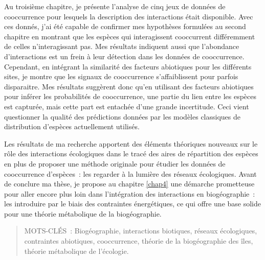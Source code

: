 Au troisième chapitre, je présente l'analyse de cinq jeux de données de
cooccurrence pour lesquels la description des interactions était
disponible. Avec ces donnés, j'ai été capable de confirmer mes
hypothèses formulées au second chapitre en montrant que les espèces qui
interagissent cooccurrent différemment de celles n'interagissant pas.
Mes résultats indiquent aussi que l'abondance d'interactions est un
frein à leur détection dans les données de cooccurrence. Cependant, en
intégrant la similarité des facteurs abiotiques pour les différents
sites, je montre que les signaux de cooccurrence s'affaiblissent pour
parfois disparaitre. Mes résultats suggèrent donc qu'en utilisant des
facteurs abiotiques pour inférer les probabilités de cooccurrence, une
partie du lien entre les espèces est capturée, mais cette part est
entachée d'une grande incertitude. Ceci vient questionner la qualité des
prédictions données par les modèles classiques de distribution d'espèces
actuellement utilisés.

Les résultats de ma recherche apportent des éléments théoriques nouveaux
sur le rôle des interactions écologiques dans le tracé des aires de
répartition des espèces en plus de proposer une méthode originale pour
étudier les données de cooccurrence d'espèces~: les regarder à la
lumière des réseaux écologiques. Avant de conclure ma thèse, je propose
au chapitre \ref{chap4} une démarche prometteuse pour aller encore plus
loin dans l'intégration des interactions en biogéographie~: les
introduire par le biais des contraintes énergétiques, ce qui offre une
base solide pour une théorie métabolique de la biogéographie.

\begin{quote}
MOTS-CLÉS~: Biogéographie, interactions biotiques, réseaux écologiques,
contraintes abiotiques, cooccurrence, théorie de la biogéographie des
îles, théorie métabolique de l'écologie.
\end{quote}
